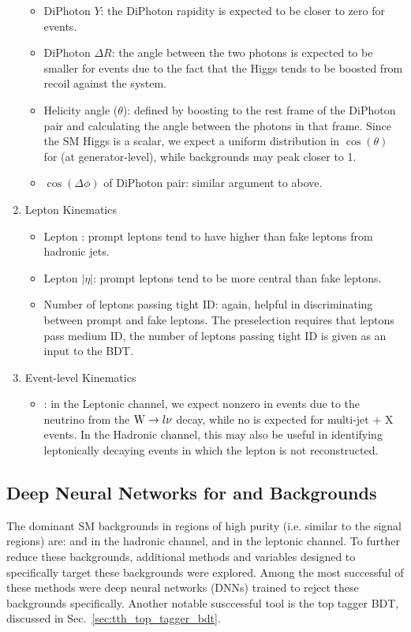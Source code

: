 \begin{enumerate}
\begin{itemize}
        \item DiPhoton $Y$: the DiPhoton rapidity is expected to be closer to zero for \ttH events.
        \item DiPhoton $\Delta R$: the angle between the two photons is expected to be smaller for \ttH events due to the fact that the Higgs tends to be boosted from recoil against the \ttb system.
        \item Helicity angle ($\theta$): defined by boosting to the rest frame of the DiPhoton pair and calculating the angle between the photons in that frame. Since the SM Higgs is a scalar, we expect a uniform distribution in $\cos(\theta)$ for \ttH (at generator-level), while backgrounds may peak closer to 1.
        \item $\cos (\Delta \phi)$ of DiPhoton pair: similar argument to above.
    \end{itemize}
    \item Lepton Kinematics
    \begin{itemize}
        \item Lepton \pT: prompt leptons tend to have higher \pT than fake leptons from hadronic jets.
        \item Lepton $|\eta|$: prompt leptons tend to be more central than fake leptons.
        \item Number of leptons passing tight ID: again, helpful in discriminating between prompt and fake leptons. The preselection requires that leptons pass medium ID, the number of leptons passing tight ID is given as an input to the BDT.
    \end{itemize}
    \item Event-level Kinematics
    \begin{itemize}
        \item \met: in the Leptonic channel, we expect nonzero \met in \ttb events due to the neutrino from the $\mathrm{W}\to l\nu$ decay, while no \met is expected for multi-jet + X events. In the Hadronic channel, this may also be useful in identifying leptonically decaying \ttH events in which the lepton is not reconstructed.
    \end{itemize}
\end{enumerate}

\subsection{Deep Neural Networks for \dipho and \ttgg Backgrounds} \label{sec:tth_dnns}
The dominant SM backgrounds in regions of high \ttH purity (i.e. similar to the signal regions) are: \dipho and \ttgg in the hadronic channel, and \ttgg in the leptonic channel.
To further reduce these backgrounds, additional methods and variables designed to specifically target these backgrounds were explored.
Among the most successful of these methods were deep neural networks (DNNs) trained to reject these backgrounds specifically.
Another notable susccessful tool is the top tagger BDT, discussed in Sec.~\ref{sec:tth_top_tagger_bdt}.

